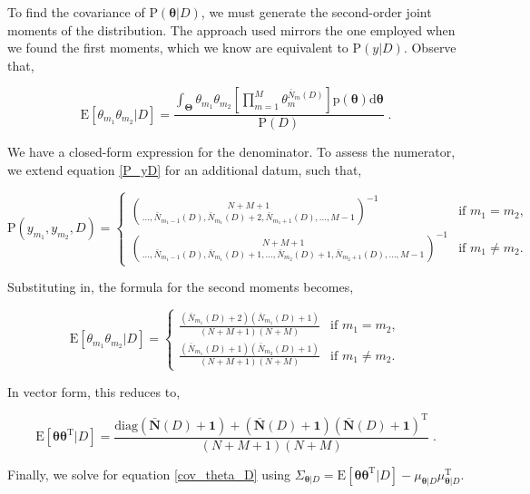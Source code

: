 \documentclass[12pt]{article}
\begin{document}
To find the covariance of $\text{P}(\bm{\theta}|D)$, we must generate the second-order joint moments of the distribution. The approach used mirrors the one employed when we found the first moments, which we know are equivalent to $\text{P}(y|D)$. Observe that,

\begin{equation}
\text{E}[\theta_{m_1} \theta_{m_2} | D] = \frac{\int_{\bm{\Theta}} \theta_{m_1} \theta_{m_2} \left[ \prod_{m=1}^M \theta_m^{\bar{N}_m(D)} \right] \text{p}(\bm{\theta}) \mathrm{d}\bm{\theta}}{\text{P}(D)} \;.
\end{equation}

We have a closed-form expression for the denominator. To assess the numerator, we extend equation \eqref{P_yD} for an additional datum, such that,

\begin{equation}
\text{P}(y_{m_1},y_{m_2},D) = 
\begin{cases}
\binom{N+M+1}{\ldots,\bar{N}_{m_1-1}(D),\bar{N}_{m_1}(D)+2,\bar{N}_{m_1+1}(D),\ldots,M-1}^{-1} & \text{if } m_1 = m_2, \\ 
\binom{N+M+1}{\ldots,\bar{N}_{m_1-1}(D),\bar{N}_{m_1}(D)+1,\ldots,\bar{N}_{m_2}(D)+1,\bar{N}_{m_2+1}(D),\ldots,M-1}^{-1} & \text{if } m_1 \neq m_2.
\end{cases}
\end{equation}

Substituting in, the formula for the second moments becomes,

\begin{equation}
\text{E}[\theta_{m_1} \theta_{m_2} | D] =
\begin{cases}
\frac{(\bar{N}_{m_1}(D)+2)(\bar{N}_{m_1}(D)+1)}{(N+M+1)(N+M)} & \text{if } m_1 = m_2, \\  
\frac{(\bar{N}_{m_1}(D)+1)(\bar{N}_{m_2}(D)+1)}{(N+M+1)(N+M)} & \text{if } m_1 \neq m_2.
\end{cases}
\end{equation}

In vector form, this reduces to,

\begin{equation}
\text{E}[\bm{\theta} \bm{\theta}^\text{T} | D] = \frac{\text{diag}(\bar{\bm{N}}(D) + \bm{1}) + (\bar{\bm{N}}(D) + \bm{1}) (\bar{\bm{N}}(D) + \bm{1})^\text{T}}{(N+M+1)(N+M)} \;.
\end{equation}

Finally, we solve for equation \eqref{cov_theta_D} using $\Sigma_{\bm{\theta} | D} = \text{E}[\bm{\theta} \bm{\theta}^\text{T} | D] -  \mu_{\bm{\theta} | D} \mu_{\bm{\theta} | D}^\text{T}$.
\end{document}
